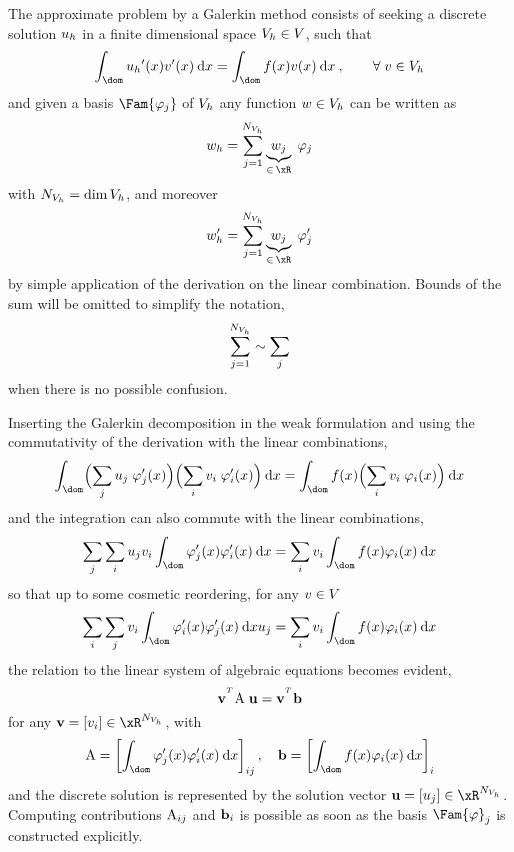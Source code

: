 \medskip
The approximate problem by a Galerkin method consists of seeking a discrete solution ${u_h}$ in a finite dimensional space ${{V}}_h \in {V}$, such that
\begin{equation*}
\int_\dom \uh'(x) v'(x) \md x = \int_\dom f(x) v(x) \md x\:,\qquad\forany v \in \xVh
\end{equation*}
and given a basis $\Fam{\varphi_j}$ of ${{V}}_h$ any function $w\in{{V}}_h$ can be written as
\begin{equation*}
w_h = \sum_{j=1}^{\NxVh} \underbrace{w_j}_{\in\,\xR}\;\varphi_j
\end{equation*}
with ${N_{{{V}}_h}} = \dim{{{V}}_h}$, and moreover
\begin{equation*}
w'_h = \sum_{j=1}^{\NxVh} \underbrace{w_j}_{\in\,\xR}\;\varphi'_j
\end{equation*}
by simple application of the derivation on the linear combination.
Bounds of the sum will be omitted to simplify the notation,
\begin{equation*}
\sum_{j=1}^{{N_{{{V}}_h}}} \sim \sum_{j}
\end{equation*}
 when there is no possible confusion.

\medskip
Inserting the Galerkin decomposition in the weak formulation and using the commutativity of the derivation with the linear combinations,
\begin{equation*}
\int_\dom \Bigl(\sum_{j} u_j\;\varphi'_j(x)\Bigr) \Bigl(\sum_{i} v_i\;\varphi'_i(x)\Bigr) \md x = \int_\dom f(x) \Bigl(\sum_{i} v_i\;\varphi_i(x)\Bigr) \md x
\end{equation*}
and the integration can also commute with the linear combinations,
\begin{equation*}
\sum_{j} \sum_{i} u_j v_i \int_\dom \varphi'_j(x)\varphi'_i(x) \md x = \sum_{i} v_i\int_\dom f(x) \varphi_i(x) \md x
\end{equation*}
so that up to some cosmetic reordering, for any $v \in {V}$
\begin{equation*}
\sum_{i}  \sum_{j} v_i \int_\dom \varphi'_i(x)\varphi'_j(x) \md x u_j = \sum_{i} v_i\int_\dom f(x) \varphi_i(x) \md x
\end{equation*}
the relation to the linear system of algebraic equations becomes evident,
\begin{equation*}
\vecv^\trans \matA\;\vecu = \vecv^\trans \vecb
\end{equation*}
for any $\vecv = [v_i]\in \xR^\NxVh$, with
\begin{equation*}
\matA = \left[\int_\dom \varphi'_j(x)\varphi'_i(x) \md x\right]_{ij},\quad\vecb = \left[\int_\dom f(x) \varphi_i(x) \md x\right]_{i}
\end{equation*}
and the discrete solution is represented by the solution vector $\vecu = [u_j]\in \xR^\NxVh$.
Computing contributions ${\mathrm A}_{ij}$ and $\mathbf b_i$ is possible as soon as the basis $\Fam{\varphi}_j$ is constructed explicitly.

